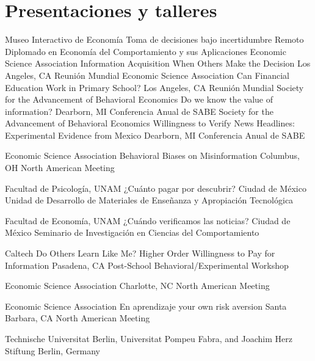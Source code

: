 \section{Presentaciones y talleres}

{Museo Interactivo de Economía}
{Toma de decisiones bajo incertidumbre}
{Remoto}
{}
{Diplomado en Economía del Comportamiento y sus Aplicaciones}
{Economic Science Association}
{Information Acquisition When Others Make the Decision}
{Los Angeles, CA}
{}
{Reunión Mundial}
{Economic Science Association}
{Can Financial Education Work in Primary School?}
{Los Angeles, CA}
{}
{Reunión Mundial}
{Society for the Advancement of Behavioral Economics}
{Do we know the value of information?}
{Dearborn, MI}
{}
{Conferencia Anual de SABE}
{Society for the Advancement of Behavioral Economics}
{Willingness to Verify News Headlines: Experimental Evidence from Mexico}
{Dearborn, MI}
{}
{Conferencia Anual de SABE}

{Economic Science Association}
{Behavioral Biases on Misinformation}
{Columbus, OH}
{}
{North American Meeting}


{Facultad de Psicología, UNAM}
{¿Cuánto pagar por descubrir?}
{Ciudad de México}
{}
{Unidad de Desarrollo de Materiales de Enseñanza y Apropiación Tecnológica}

{Facultad de Economía, UNAM}
{¿Cuándo verificamos las noticias?}
{Ciudad de México}
{}
{Seminario de Investigación en Ciencias del Comportamiento }

{Caltech}
{Do Others Learn Like Me? Higher Order Willingness to Pay for Information}
{Pasadena, CA}
{}
{Post-School Behavioral/Experimental Workshop}


{Economic Science Association}
{
}
{Charlotte, NC}
{}
{North American Meeting}

{Economic Science Association}
{En aprendizaje your own risk aversion}
{Santa Barbara, CA}
{}
{North American Meeting}

{Technische Universitat Berlin, Universitat Pompeu Fabra, and Joachim Herz Stiftung}
{}
{Berlin, Germany}
{}
{}
